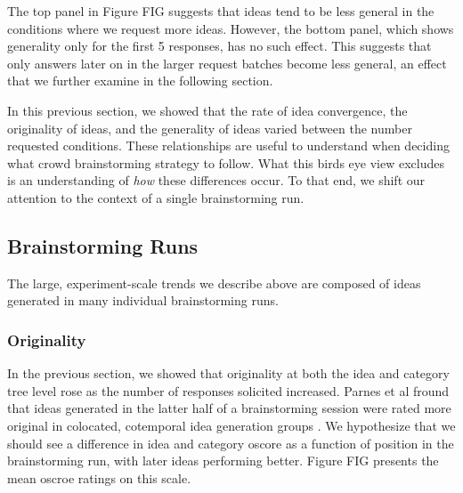 The top panel in Figure FIG suggests that ideas tend to be less general in the conditions where we request more ideas. However, the bottom panel, which shows generality only for the first 5 responses, has no such effect. This suggests that only answers later on in the larger request batches become less general, an effect that we further examine in the following section.

In this previous section, we showed that the rate of idea convergence, the originality of ideas, and the generality of ideas varied between the number requested conditions. These relationships are useful to understand when deciding what crowd brainstorming strategy to follow. What this birds eye view excludes is an understanding of \emph{how} these differences occur. To that end, we shift our attention to the context of a single brainstorming run.

\subsection{Brainstorming Runs}

The large, experiment-scale trends we describe above are composed of ideas generated in many individual brainstorming runs.

\subsubsection{Originality}

In the previous section, we showed that originality at both the idea and category tree level rose as the number of responses solicited increased. Parnes et al fround that ideas generated in the latter half of a brainstorming session were rated more original in colocated, cotemporal idea generation groups \cite{parnes_effects_1961}. We hypothesize that we should see a difference in idea and category oscore as a function of position in the brainstorming run, with later ideas performing better. Figure FIG presents the mean oscroe ratings on this scale.

